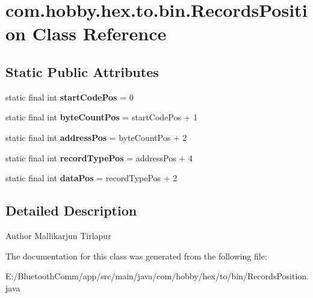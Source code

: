 \hypertarget{classcom_1_1hobby_1_1hex_1_1to_1_1bin_1_1_records_position}{}\section{com.\+hobby.\+hex.\+to.\+bin.\+Records\+Position Class Reference}
\label{classcom_1_1hobby_1_1hex_1_1to_1_1bin_1_1_records_position}
\subsection*{Static Public Attributes}
\begin{DoxyCompactItemize}
\item 
\mbox{\label{classcom_1_1hobby_1_1hex_1_1to_1_1bin_1_1_records_position_ae84330e7c849f2349ac9a5dc5e8cd656}} 
static final int {\bfseries start\+Code\+Pos} = 0
\item 
\mbox{\label{classcom_1_1hobby_1_1hex_1_1to_1_1bin_1_1_records_position_a160ae7edc7a4f57b12c23375450e6409}} 
static final int {\bfseries byte\+Count\+Pos} = start\+Code\+Pos + 1
\item 
\mbox{\label{classcom_1_1hobby_1_1hex_1_1to_1_1bin_1_1_records_position_a058a83a17ac4f5e2cf95efe7b7b24dae}} 
static final int {\bfseries address\+Pos} = byte\+Count\+Pos + 2
\item 
\mbox{\label{classcom_1_1hobby_1_1hex_1_1to_1_1bin_1_1_records_position_a7e05367c5d75dd36e49caf537ae34f4c}} 
static final int {\bfseries record\+Type\+Pos} = address\+Pos + 4
\item 
\mbox{\label{classcom_1_1hobby_1_1hex_1_1to_1_1bin_1_1_records_position_a36eab943b6fe4cf0cc8f71b3a69727c6}} 
static final int {\bfseries data\+Pos} = record\+Type\+Pos + 2
\end{DoxyCompactItemize}


\subsection{Detailed Description}
\begin{DoxyAuthor}{Author}
Mallikarjun Tirlapur 
\end{DoxyAuthor}


The documentation for this class was generated from the following file\+:\begin{DoxyCompactItemize}
\item 
E\+:/\+Bluetooth\+Comm/app/src/main/java/com/hobby/hex/to/bin/Records\+Position.\+java\end{DoxyCompactItemize}
